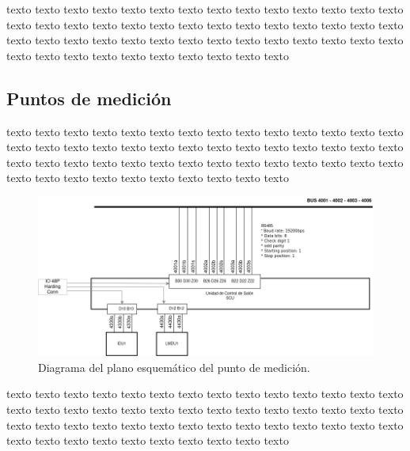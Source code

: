 \documentclass[
11pt, %
]{charter}
\begin{document}
texto texto texto texto texto texto texto texto texto texto texto texto texto texto texto texto texto texto texto texto texto texto texto texto texto texto texto texto texto texto texto texto texto texto texto texto texto texto texto texto texto texto texto texto texto texto texto texto texto texto texto texto 


\pagebreak
\subsection{Puntos de medición}

texto texto texto texto texto texto texto texto texto texto texto texto texto texto texto texto texto texto texto texto texto texto texto texto texto texto texto texto texto texto texto texto texto texto texto texto texto texto texto texto texto texto texto texto texto texto texto texto texto texto texto texto 


\begin{figure}[htpb]
\centering 
\includegraphics[width=1\textwidth]{./Pics/RedPIDS.drawio.png}
\caption{Diagrama del plano esquemático del punto de medición.}
\label{fig:test point SCU-PIDS diagram}
\end{figure}


texto texto texto texto texto texto texto texto texto texto texto texto texto texto texto texto texto texto texto texto texto texto texto texto texto texto texto texto texto texto texto texto texto texto texto texto texto texto texto texto texto texto texto texto texto texto texto texto texto texto texto texto 
\end{document}
